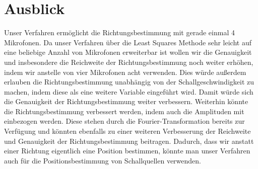 \section{Ausblick} 
Unser Verfahren ermöglicht die Richtungsbestimmung mit gerade einmal 4 Mikrofonen. Da unser Verfahren über die Least Squares Methode sehr leicht auf eine beliebige Anzahl von Mikrofonen erweiterbar ist wollen wir die Genauigkeit und insbesondere die Reichweite der Richtungsbestimmung noch weiter erhöhen, indem wir anstelle von vier Mikrofonen acht verwenden. Dies würde außerdem erlauben die Richtungsbestimmung unabhängig von der Schallgeschwindigkeit zu machen, indem diese als eine weitere Variable eingeführt wird. Damit würde sich die Genauigkeit der Richtungsbestimmung weiter verbessern.
Weiterhin könnte die Richtungsbestimmung verbessert werden, indem auch die Amplituden mit einbezogen werden. Diese stehen durch die Fourier-Transformation bereits zur Verfügung und könnten ebenfalls zu einer weiteren Verbesserung der Reichweite und Genauigkeit der Richtungsbestimmung beitragen.
Dadurch, dass wir anstatt einer Richtung eigentlich eine Position bestimmen, könnte man unser Verfahren auch für die Positionsbestimmung von Schallquellen verwenden.
